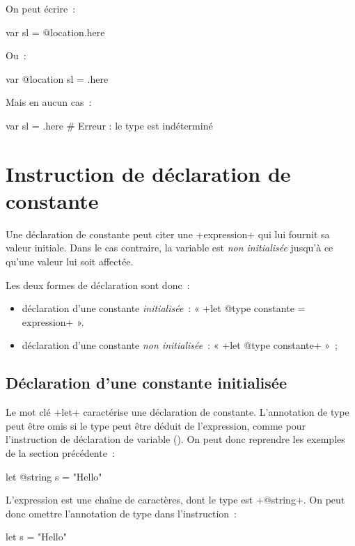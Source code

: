 On peut écrire~:
\begin{galgas}
var sl = @location.here
\end{galgas}

Ou~:
\begin{galgas}
var @location sl = .here
\end{galgas}

Mais en aucun cas~:
\begin{galgas}
var sl = .here # Erreur : le type est indéterminé
\end{galgas}





\section{Instruction de déclaration de constante}

Une déclaration de constante peut citer une \ggs+expression+ qui lui fournit sa valeur initiale. Dans le cas contraire, la variable est \emph{non initialisée} jusqu'à ce qu'une valeur lui soit affectée.

Les deux formes de déclaration sont donc~:
\begin{itemize}
\item déclaration d'une constante \emph{initialisée}~: « \ggs+let @type constante = expression+ ».
\item déclaration d'une constante \emph{non initialisée}~: « \ggs+let @type constante+ »~;
\end{itemize}

\subsection{Déclaration d'une constante initialisée}


Le mot clé \ggs+let+ caractérise une déclaration de constante. L'annotation de type peut être omis si le type peut être déduit de l'expression, comme pour l'instruction de déclaration de variable (). On peut donc reprendre les exemples de la section précédente~:
\begin{galgas}
let @string s = "Hello"
\end{galgas}

L'expression est une chaîne de caractères, dont le type est \ggs+@string+. On peut donc omettre l'annotation de type dans l'instruction~:
\begin{galgas}
let s = "Hello"
\end{galgas}


